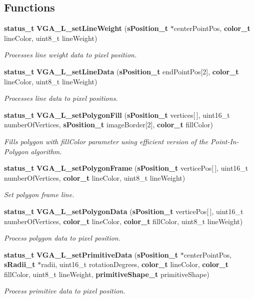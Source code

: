\subsection*{Functions}
\begin{DoxyCompactItemize}
\item 
{\bf status\+\_\+t} {\bf V\+G\+A\+\_\+\+L\+\_\+set\+Line\+Weight} ({\bf s\+Position\+\_\+t} $\ast$center\+Point\+Pos, {\bf color\+\_\+t} line\+Color, uint8\+\_\+t line\+Weight)
\begin{DoxyCompactList}\small\item\em Processes line weight data to pixel position. \end{DoxyCompactList}\item 
{\bf status\+\_\+t} {\bf V\+G\+A\+\_\+\+L\+\_\+set\+Line\+Data} ({\bf s\+Position\+\_\+t} end\+Point\+Pos[2], {\bf color\+\_\+t} line\+Color, uint8\+\_\+t line\+Weight)
\begin{DoxyCompactList}\small\item\em Processes line data to pixel positions. \end{DoxyCompactList}\item 
{\bf status\+\_\+t} {\bf V\+G\+A\+\_\+\+L\+\_\+set\+Polygon\+Fill} ({\bf s\+Position\+\_\+t} vertices[$\,$], uint16\+\_\+t number\+Of\+Vertices, {\bf s\+Position\+\_\+t} image\+Border[2], {\bf color\+\_\+t} fill\+Color)
\begin{DoxyCompactList}\small\item\em Fills polygon with fill\+Color parameter using efficient version of the Point-\/\+In-\/\+Polygon algorithm. \end{DoxyCompactList}\item 
{\bf status\+\_\+t} {\bf V\+G\+A\+\_\+\+L\+\_\+set\+Polygon\+Frame} ({\bf s\+Position\+\_\+t} vertice\+Pos[$\,$], uint16\+\_\+t number\+Of\+Vertices, {\bf color\+\_\+t} line\+Color, uint8\+\_\+t line\+Weight)
\begin{DoxyCompactList}\small\item\em Set polygon frame line. \end{DoxyCompactList}\item 
{\bf status\+\_\+t} {\bf V\+G\+A\+\_\+\+L\+\_\+set\+Polygon\+Data} ({\bf s\+Position\+\_\+t} vertice\+Pos[$\,$], uint16\+\_\+t number\+Of\+Vertices, {\bf color\+\_\+t} line\+Color, {\bf color\+\_\+t} fill\+Color, uint8\+\_\+t line\+Weight)
\begin{DoxyCompactList}\small\item\em Process polygon data to pixel position. \end{DoxyCompactList}\item 
{\bf status\+\_\+t} {\bf V\+G\+A\+\_\+\+L\+\_\+set\+Primitive\+Data} ({\bf s\+Position\+\_\+t} $\ast$center\+Point\+Pos, {\bf s\+Radii\+\_\+t} $\ast$radii, uint16\+\_\+t rotation\+Degrees, {\bf color\+\_\+t} line\+Color, {\bf color\+\_\+t} fill\+Color, uint8\+\_\+t line\+Weight, {\bf primitive\+Shape\+\_\+t} primitive\+Shape)
\begin{DoxyCompactList}\small\item\em Process primitive data to pixel position. \end{DoxyCompactList}\end{DoxyCompactItemize}


